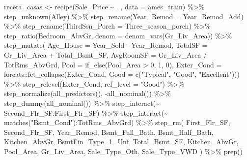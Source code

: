 \documentclass[
]{book}
\newenvironment{Shaded}{\begin{snugshade}}{\end{snugshade}}
\newcommand{\AttributeTok}[1]{\textcolor[rgb]{0.77,0.63,0.00}{#1}}
\newcommand{\DecValTok}[1]{\textcolor[rgb]{0.00,0.00,0.81}{#1}}
\newcommand{\FunctionTok}[1]{\textcolor[rgb]{0.00,0.00,0.00}{#1}}
\newcommand{\NormalTok}[1]{#1}
\newcommand{\OtherTok}[1]{\textcolor[rgb]{0.56,0.35,0.01}{#1}}
\newcommand{\SpecialCharTok}[1]{\textcolor[rgb]{0.00,0.00,0.00}{#1}}
\newcommand{\StringTok}[1]{\textcolor[rgb]{0.31,0.60,0.02}{#1}}
\begin{document}
\begin{Shaded}
\begin{Highlighting}[]
\NormalTok{receta\_casas }\OtherTok{\textless{}{-}} \FunctionTok{recipe}\NormalTok{(Sale\_Price }\SpecialCharTok{\textasciitilde{}}\NormalTok{ . , }\AttributeTok{data =}\NormalTok{ ames\_train) }\SpecialCharTok{\%\textgreater{}\%}
  \FunctionTok{step\_unknown}\NormalTok{(Alley) }\SpecialCharTok{\%\textgreater{}\%}
  \FunctionTok{step\_rename}\NormalTok{(}\AttributeTok{Year\_Remod =}\NormalTok{ Year\_Remod\_Add) }\SpecialCharTok{\%\textgreater{}\%} 
  \FunctionTok{step\_rename}\NormalTok{(}\AttributeTok{ThirdSsn\_Porch =}\NormalTok{ Three\_season\_porch) }\SpecialCharTok{\%\textgreater{}\%} 
  \FunctionTok{step\_ratio}\NormalTok{(Bedroom\_AbvGr, }\AttributeTok{denom =} \FunctionTok{denom\_vars}\NormalTok{(Gr\_Liv\_Area)) }\SpecialCharTok{\%\textgreater{}\%} 
  \FunctionTok{step\_mutate}\NormalTok{(}
    \AttributeTok{Age\_House =}\NormalTok{ Year\_Sold }\SpecialCharTok{{-}}\NormalTok{ Year\_Remod,}
    \AttributeTok{TotalSF   =}\NormalTok{ Gr\_Liv\_Area }\SpecialCharTok{+}\NormalTok{ Total\_Bsmt\_SF,}
    \AttributeTok{AvgRoomSF   =}\NormalTok{ Gr\_Liv\_Area }\SpecialCharTok{/}\NormalTok{ TotRms\_AbvGrd,}
    \AttributeTok{Pool =} \FunctionTok{if\_else}\NormalTok{(Pool\_Area }\SpecialCharTok{\textgreater{}} \DecValTok{0}\NormalTok{, }\DecValTok{1}\NormalTok{, }\DecValTok{0}\NormalTok{),}
    \AttributeTok{Exter\_Cond =}\NormalTok{ forcats}\SpecialCharTok{::}\FunctionTok{fct\_collapse}\NormalTok{(Exter\_Cond, }\AttributeTok{Good =} \FunctionTok{c}\NormalTok{(}\StringTok{"Typical"}\NormalTok{, }\StringTok{"Good"}\NormalTok{, }\StringTok{"Excellent"}\NormalTok{))) }\SpecialCharTok{\%\textgreater{}\%} 
  \FunctionTok{step\_relevel}\NormalTok{(Exter\_Cond, }\AttributeTok{ref\_level =} \StringTok{"Good"}\NormalTok{) }\SpecialCharTok{\%\textgreater{}\%} 
  \FunctionTok{step\_normalize}\NormalTok{(}\FunctionTok{all\_predictors}\NormalTok{(), }\SpecialCharTok{{-}}\FunctionTok{all\_nominal}\NormalTok{()) }\SpecialCharTok{\%\textgreater{}\%}
  \FunctionTok{step\_dummy}\NormalTok{(}\FunctionTok{all\_nominal}\NormalTok{()) }\SpecialCharTok{\%\textgreater{}\%} 
  \FunctionTok{step\_interact}\NormalTok{(}\SpecialCharTok{\textasciitilde{}}\NormalTok{ Second\_Flr\_SF}\SpecialCharTok{:}\NormalTok{First\_Flr\_SF) }\SpecialCharTok{\%\textgreater{}\%} 
  \FunctionTok{step\_interact}\NormalTok{(}\SpecialCharTok{\textasciitilde{}} \FunctionTok{matches}\NormalTok{(}\StringTok{"Bsmt\_Cond"}\NormalTok{)}\SpecialCharTok{:}\NormalTok{TotRms\_AbvGrd) }\SpecialCharTok{\%\textgreater{}\%} 
  \FunctionTok{step\_rm}\NormalTok{(}
\NormalTok{    First\_Flr\_SF, Second\_Flr\_SF, Year\_Remod,}
\NormalTok{    Bsmt\_Full\_Bath, Bsmt\_Half\_Bath, }
\NormalTok{    Kitchen\_AbvGr, BsmtFin\_Type\_1\_Unf, }
\NormalTok{    Total\_Bsmt\_SF, Kitchen\_AbvGr, Pool\_Area, }
\NormalTok{    Gr\_Liv\_Area, Sale\_Type\_Oth, Sale\_Type\_VWD}
\NormalTok{  ) }\SpecialCharTok{\%\textgreater{}\%} 
  \FunctionTok{prep}\NormalTok{()}
\end{Highlighting}
\end{Shaded}
\end{document}
